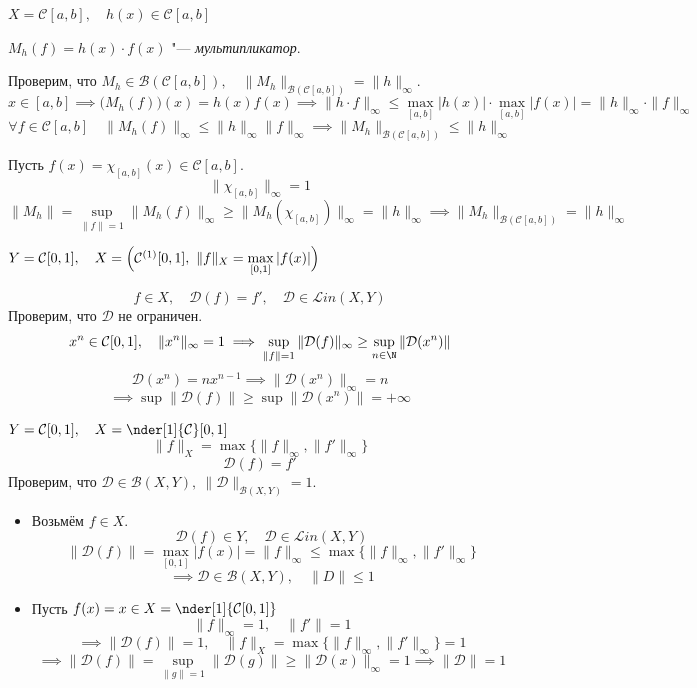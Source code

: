 \begin{exmpls}
\item $ X = \mathcal C[a, b], \quad h(x) \in \mathcal C[a, b] $

	$ M_h(f) = h(x) \cdot f(x) $ "--- \emph{мультипликатор}.

	Проверим, что $ M_h \in \mathscr B(\mathcal C[a, b]), \quad
	\|M_h\|_{\mathscr B(\mathcal C[a, b])} = \|h\|_\infty $.
	$$ x \in [a, b] \implies \bigl( M_h(f) \bigr)(x) = h(x)f(x) \implies
	\|h \cdot f\|_\infty \le \max\limits_{[a, b]} |h(x)| \cdot \max\limits_{[a, b]}|f(x)| =
	\|h\|_\infty \cdot \|f\|_\infty $$
	$$ \forall f \in \mathcal C[a, b] \quad \|M_h(f)\|_\infty \le \|h\|_\infty \|f\|_\infty \implies
	\|M_h\|_{\mathscr B(\mathcal C[a, b])} \le \|h\|_\infty $$

	Пусть $ f(x) = \chi_{[a, b]}(x) \in \mathcal C[a, b] $.
	$$ \|\chi_{[a, b]}\|_\infty = 1 $$
	$$ \|M_h\| = \sup\limits_{\|f\| = 1} \|M_h(f)\|_\infty \ge \|M_h(\chi_{[a, b]})\|_\infty =
	\|h\|_\infty \implies
	\|M_h\|_{\mathscr B(\mathcal C[a, b])} = \|h\|_\infty $$
\item $ Y = \mathcal C[0, 1], \quad X = \Bigl( \mathcal C^{(1)}[0, 1], \ \|f\|_X =
	\max\limits_{[0, 1]}|f(x)| \Bigr) $

	$$ f \in X, \quad \mathcal D(f) = f', \quad \mathcal D \in \mathcal Lin(X, Y) $$
	Проверим, что $ \mathcal D $ не ограничен.
	$$ x^n \in \mathcal C[0, 1], \quad \|x^n\|_\infty = 1 \implies
	\sup\limits_{\|f\| = 1} \|\mathcal D(f)\|_\infty \ge \sup\limits_{n \in \N} \|\mathcal D(x^n)\| $$
	$$ \mathcal D(x^n) = nx^{n - 1} \implies \|\mathcal D(x^n)\|_\infty = n $$
	$$ \implies \sup \|\mathcal D(f)\| \ge \sup \|\mathcal D(x^n)\| = +\infty $$
\item $ Y = \mathcal C[0, 1], \quad X = \nder[1]{\mathcal C}[0, 1] $
	$$ \|f\|_X = \max\{\|f\|_\infty, \|f'\|_\infty\} $$
	$$ \mathcal D(f) = f' $$
	Проверим, что $ \mathcal D \in \mathscr B(X, Y), ~ \|\mathcal D\|_{\mathscr B(X, Y)} = 1 $.

	\begin{itemize}
		\item Возьмём $ f \in X $.
			$$ \mathcal D(f) \in Y, \quad \mathcal D \in \mathscr Lin(X, Y) $$
			$$ \|\mathcal D(f)\| = \max\limits_{[0, 1]}|f(x)| = \|f\|_\infty \le
			\max\{\|f\|_\infty, \|f'\|_\infty\} $$
			$$ \implies \mathcal D \in \mathscr B(X, Y), \quad \|D\| \le 1 $$
		\item Пусть $ f(x) = x \in X = \nder[1]{\mathcal C[0, 1]} $
			$$ \|f\|_\infty = 1, \quad \|f'\| = 1 $$
			$$ \implies \|\mathcal D(f)\| = 1, \quad \|f\|_X =
			\max\{\|f\|_\infty, \|f'\|_\infty\} = 1 $$
			$$ \implies \|\mathcal D(f)\| = \sup\limits_{\|g\| = 1}\|\mathcal D(g)\| \ge
			\|\mathcal D(x)\|_\infty = 1 \implies
			\|\mathcal D \| = 1 $$
	\end{itemize}
\end{exmpls}


